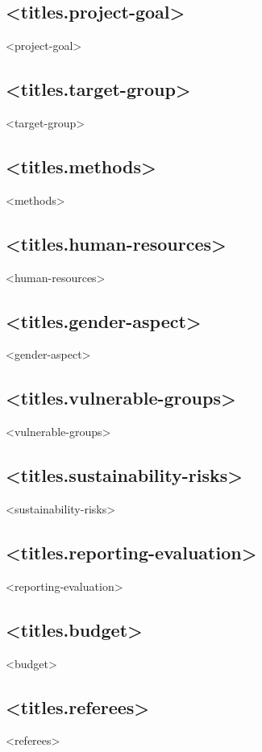 \documentclass[twoside,a4paper]{article}
\begin{document}
		\subsection*{<titles.project-goal>}
		    <project-goal>
		
		\subsection*{<titles.target-group>}
		    <target-group>
		
		\subsection*{<titles.methods>}
		    <methods>

		\subsection*{<titles.human-resources>}
		    <human-resources>
		
		\subsection*{<titles.gender-aspect>}
		    <gender-aspect>
		
		\subsection*{<titles.vulnerable-groups>}
		    <vulnerable-groups>
		
		\subsection*{<titles.sustainability-risks>}
		    <sustainability-risks>
		
		\subsection*{<titles.reporting-evaluation>}
		    <reporting-evaluation>
		
		\subsection*{<titles.budget>}
		    <budget>
		
		\subsection*{<titles.referees>}
		    <referees>
		
\end{document}
